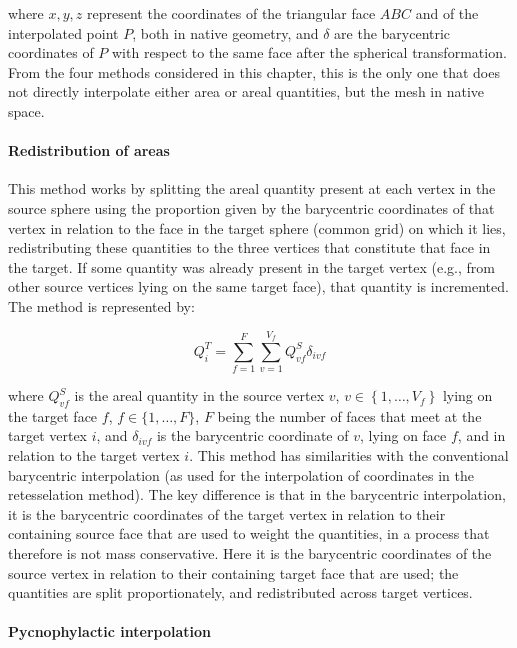 \noindent
where $x,y,z$ represent the coordinates of the triangular face $ABC$ and of the interpolated point $P$, both in native geometry, and $\delta$ are the barycentric coordinates of $P$ with respect to the same face after the spherical transformation. From the four methods considered in this chapter, this is the only one that does not directly interpolate either area or areal quantities, but the mesh in native space.

\paragraph{Redistribution of areas}

This method works by splitting the areal quantity present at each vertex in the source sphere using the proportion given by the barycentric coordinates of that vertex in relation to the face in the target sphere (common grid) on which it lies, redistributing these quantities to the three vertices that constitute that face in the target. If some quantity was already present in the target vertex (e.g., from other source vertices lying on the same target face), that quantity is incremented. The method is represented by:

$$
Q^T_i = \sum_{f=1}^F\sum_{v=1}^{V_f} Q^S_{vf}\delta_{ivf}
$$

\noindent
where $Q^S_{vf}$ is the areal quantity in the source vertex $v$, $v\in\left\{1, \ldots, V_f \right\}$ lying on the target face $f$, $f\in\{1,\ldots,F\}$, $F$ being the number of faces that meet at the target vertex $i$, and $\delta_{ivf}$ is the barycentric coordinate of $v$, lying on face $f$, and in relation to the target vertex $i$. This method has similarities with the conventional barycentric interpolation (as used for the interpolation of coordinates in the retesselation method). The key difference is that in the barycentric interpolation, it is the barycentric coordinates of the target vertex in relation to their containing source face that are used to weight the quantities, in a process that therefore is not mass conservative. Here it is the barycentric coordinates of the source vertex in relation to their containing target face that are used; the quantities are split proportionately, and redistributed across target vertices.

\paragraph{Pycnophylactic interpolation}


